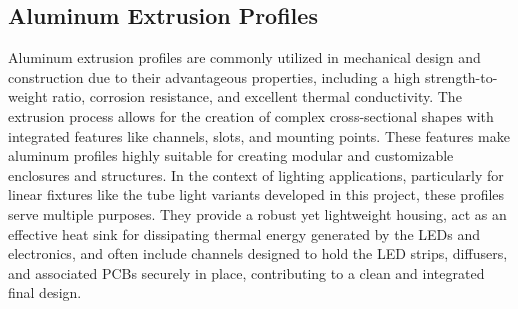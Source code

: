 \subsection{Aluminum Extrusion Profiles}\label{subsec:theoretical_aluminum_profiles}
Aluminum extrusion profiles are commonly utilized in mechanical design and construction due to their advantageous properties, including a high strength-to-weight ratio, corrosion resistance, and excellent thermal conductivity. The extrusion process allows for the creation of complex cross-sectional shapes with integrated features like channels, slots, and mounting points. These features make aluminum profiles highly suitable for creating modular and customizable enclosures and structures. In the context of lighting applications, particularly for linear fixtures like the tube light variants developed in this project, these profiles serve multiple purposes. They provide a robust yet lightweight housing, act as an effective heat sink for dissipating thermal energy generated by the \ac{LED}s and electronics, and often include channels designed to hold the \ac{LED} strips, diffusers, and associated \ac{PCB}s securely in place, contributing to a clean and integrated final design.